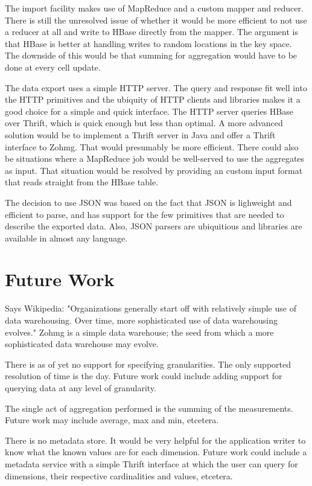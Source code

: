 The import facility makes use of MapReduce and a custom mapper and reducer.
There is still the unresolved issue of whether it would be more efficient to not
use a reducer at all and write to HBase directly from the mapper. The argument
is that HBase is better at handling writes to random locations in the key space.
The downside of this would be that summing for aggregation would have to be done
at every cell update.

The data export uses a simple HTTP server. The query and response fit well into
the HTTP primitives and the ubiquity of HTTP clients and libraries makes it a
good choice for a simple and quick interface. The HTTP server queries HBase over
Thrift, which is quick enough but less than optimal. A more advanced solution
would be to implement a Thrift server in Java and offer a Thrift interface to
Zohmg. That would presumably be more efficient. There could also be situations
where a MapReduce job would be well-served to use the aggregates as input. That
situation would be resolved by providing an custom input format that reads
straight from the HBase table.

The decision to use JSON was based on the fact that JSON is lighweight and
efficient to parse, and has support for the few primitives that are needed to
describe the exported data. Also, JSON parsers are ubiquitious and libraries are
available in almost any language.


\section{Future Work}

Says Wikipedia: "Organizations generally start off with relatively simple use of
data warehousing. Over time, more sophisticated use of data warehousing
evolves." Zohmg is a simple data warehouse; the seed from which a more
sophisticated data warehouse may evolve.

There is as of yet no support for specifying granularities. The only supported
resolution of time is the day. Future work could include adding support for
querying data at any level of granularity.

The single act of aggregation performed is the summing of the measurements.
Future work may include average, max and min, etcetera.

There is no metadata store. It would be very helpful for the application writer
to know what the known values are for each dimension. Future work could include
a metadata service with a simple Thrift interface at which the user can query
for dimensions, their respective cardinalities and values, etcetera.


